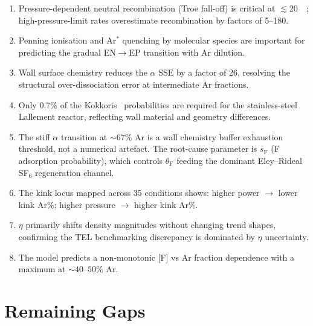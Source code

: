 \documentclass[11pt,a4paper]{report}
\begin{document}
\begin{enumerate}
\item Pressure-dependent neutral recombination (Troe fall-off) is critical at $\lesssim$\SI{20}{\milli\torr}; high-pressure-limit rates overestimate recombination by factors of 5--180.

\item Penning ionisation and Ar$^*$ quenching by molecular species are important for predicting the gradual EN$\to$EP transition with Ar dilution.

\item Wall surface chemistry reduces the $\alpha$ SSE by a factor of 26, resolving the structural over-dissociation error at intermediate Ar fractions.

\item Only 0.7\% of the Kokkoris~\cite{Kokkoris2009} probabilities are required for the stainless-steel Lallement reactor, reflecting wall material and geometry differences.

\item The stiff $\alpha$ transition at ${\sim}67\%$ Ar is a wall chemistry buffer exhaustion threshold, not a numerical artefact.  The root-cause parameter is $s_\mathrm{F}$ (F adsorption probability), which controls $\theta_\mathrm{F}$ feeding the dominant Eley--Rideal SF$_6$ regeneration channel.

\item The kink locus mapped across 35 conditions shows: higher power $\to$ lower kink Ar\%; higher pressure $\to$ higher kink Ar\%.

\item $\eta$ primarily shifts density magnitudes without changing trend shapes, confirming the TEL benchmarking discrepancy is dominated by $\eta$ uncertainty.

\item The model predicts a non-monotonic [F] vs Ar fraction dependence with a maximum at ${\sim}40$--$50\%$ Ar.
\end{enumerate}

\section{Remaining Gaps}
\label{sec:conc_gaps}
\end{document}
